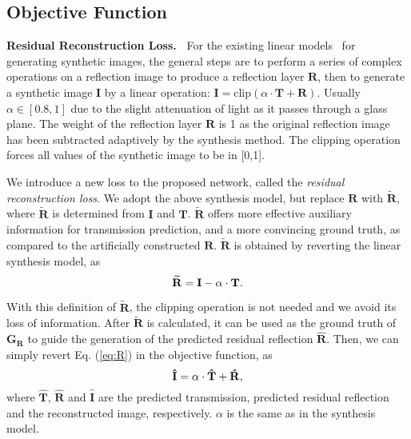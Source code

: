 \documentclass[10pt,twocolumn,letterpaper]{article}
\begin{document}
\vspace{-0.2em}
\subsection{Objective Function} \label{sec:loss}
\noindent \textbf{Residual Reconstruction Loss.~}
For the existing linear models~\cite{fan2017generic, zhang2018single} for generating synthetic images, the general steps are to perform a series of complex operations on a reflection image to produce a reflection layer $\mathbf{R}$, then to generate a synthetic image $\mathbf{I}$ by a linear operation: $\mathbf{I} = \text{clip} (\alpha \cdot \mathbf{T} + \mathbf{R})$. 
Usually $\alpha \in [0.8, 1]$ due to the slight attenuation of light as it passes through a glass plane.  
The weight of the reflection layer $\mathbf{R}$ is 1 as the original reflection image has been subtracted adaptively by the synthesis method. 
The clipping operation forces all values of the synthetic image to be in [0,1]. 


We introduce a new loss to the proposed network, called the \textit{residual reconstruction loss}. We adopt the above synthesis model, but replace $\mathbf{R}$ with $\mathbf{\widetilde{R}}$, where $\mathbf{\widetilde{R}}$ is determined from $\mathbf{I}$ and $\mathbf{T}$. $\mathbf{\widetilde{R}}$ offers more effective auxiliary information for transmission prediction, and a more convincing ground truth, as compared to the artificially constructed $\mathbf{R}$. $\mathbf{\widetilde{R}}$ is obtained by reverting the linear synthesis model, as
\begin{equation}
\vspace{-0.2em}
\mathbf{\widetilde{R}}=\mathbf{I}- \alpha \cdot \mathbf{T}.
\vspace{-0.2em}
\label{eq:R}
\end{equation}

With this definition of $\mathbf{\widetilde{R}}$, the clipping operation is not needed and we avoid its loss of information.
After $\mathbf{\widetilde{R}}$ is calculated, it can be used as the ground truth of $\bm{G_R}$ to guide the generation of the predicted residual reflection $\mathbf{\hat{R}}$.
Then, we can simply revert Eq. (\ref{eq:R}) in the objective function, as 
\begin{equation}
\vspace{-0.2em}
\mathbf{\hat{I}}=\alpha \cdot \mathbf{\hat{T}} + \mathbf{\hat{R}},
\vspace{-0.2em}
\label{eq:ITR}
\end{equation}
where $\mathbf{\hat{T}}$, $\mathbf{\hat{R}}$ and $\mathbf{\hat{I}}$ are the predicted transmission, predicted residual reflection and the reconstructed image, respectively. $\alpha$ is the same as in the synthesis model. 
\end{document}
